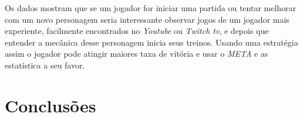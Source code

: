 \documentclass[a4paper]{article}
\begin{document}
Os dados mostram que se um jogador for iniciar uma partida ou tentar melhorar com um novo personagem seria interessante observar jogos de um jogador mais experiente, facilmente encontrados no \textit{Youtube} ou \textit{Twitch tv}, e depois que entender a mecânica desse personagem inicia seus treinos. Usando uma estratégia assim o jogador pode atingir maiores taxa de vitória e usar o \textit{META} e as estatística a seu favor.

\section{Conclusões}





\end{document}
